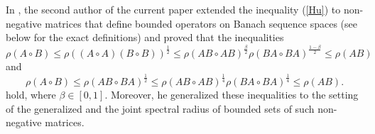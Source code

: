 \documentclass[12pt, reqno]{amsart}
\theoremstyle{definition}
\theoremstyle{remark}
\numberwithin{equation}{section}
\newcommand{\be}{\begin{equation}}
\newcommand{\ee}{\end{equation}}
\begin{document}
In  \cite{P12}, the second author of the current paper extended the inequality (\ref{Hu}) to non-negative matrices that define bounded
operators on Banach sequence spaces (see below for the exact definitions) and proved that the inequalities %
\be
\rho (A\circ B) \le \rho ((A\circ A)(B\circ B))^{\frac{1}{2}}\le \rho(AB \circ AB)^{\frac{\beta}{2}} \rho(BA \circ BA)^{\frac{1-\beta}{2}} \le \rho (AB)
\label{P1}
\ee
and
\be
\rho (A\circ B) \le \rho (AB\circ BA)^{\frac{1}{2}}\le  \rho(AB \circ AB)^{\frac{1}{4}} \rho(BA \circ BA)^{\frac{1}{4}} \le  \rho (AB).
\label{P2}
\ee
hold, where $\beta \in [0,1]$. Moreover, %
 he generalized these inequalities to the setting of the generalized and the joint spectral radius of bounded sets of such non-negative matrices. %

\end{document}
